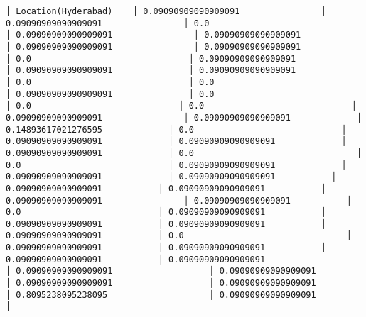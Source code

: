 \documentclass[11pt]{article}
\begin{document}
\begin{Verbatim}[commandchars=\\\{\}]
│ Location(Hyderabad)    │ 0.09090909090909091                │ 0.09090909090909091                │ 0.0                                │ 0.09090909090909091                │ 0.09090909090909091                │ 0.09090909090909091                │ 0.09090909090909091                │ 0.0                               │ 0.09090909090909091               │ 0.09090909090909091               │ 0.09090909090909091                │ 0.0                               │ 0.0                               │ 0.09090909090909091               │ 0.0                             │ 0.0                             │ 0.0                             │ 0.09090909090909091                │ 0.09090909090909091             │ 0.14893617021276595             │ 0.0                             │ 0.09090909090909091             │ 0.09090909090909091             │ 0.09090909090909091             │ 0.0                                │ 0.0                             │ 0.09090909090909091             │ 0.09090909090909091             │ 0.09090909090909091           │ 0.09090909090909091           │ 0.09090909090909091           │ 0.09090909090909091                │ 0.09090909090909091           │ 0.0                           │ 0.09090909090909091           │ 0.09090909090909091           │ 0.09090909090909091           │ 0.09090909090909091           │ 0.0                                │ 0.09090909090909091           │ 0.09090909090909091           │ 0.09090909090909091           │ 0.09090909090909091                   │ 0.09090909090909091                   │ 0.09090909090909091                   │ 0.09090909090909091                   │ 0.09090909090909091                   │ 0.8095238095238095                    │ 0.09090909090909091                   │

\end{Verbatim}
\end{document}
